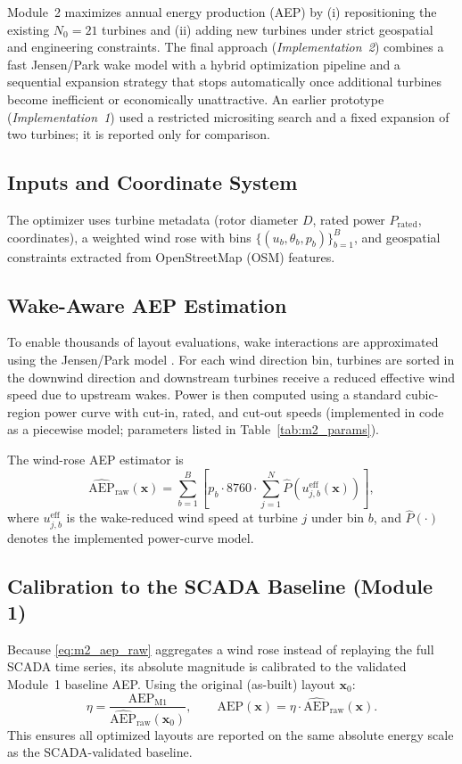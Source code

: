 \documentclass[lettersize,journal]{IEEEtran}
\begin{document}
Module~2 maximizes annual energy production (AEP) by (i) repositioning the existing $N_0=21$ turbines and (ii) adding new turbines under strict geospatial and engineering constraints. The final approach (\textit{Implementation~2}) combines a fast Jensen/Park wake model with a hybrid optimization pipeline and a sequential expansion strategy that stops automatically once additional turbines become inefficient or economically unattractive. An earlier prototype (\textit{Implementation~1}) used a restricted micrositing search and a fixed expansion of two turbines; it is reported only for comparison.

\subsection{Inputs and Coordinate System}
The optimizer uses turbine metadata (rotor diameter $D$, rated power $P_{\text{rated}}$, coordinates), a weighted wind rose with bins $\{(u_b,\theta_b,p_b)\}_{b=1}^{B}$, and geospatial constraints extracted from OpenStreetMap (OSM) features.

\subsection{Wake-Aware AEP Estimation}
To enable thousands of layout evaluations, wake interactions are approximated using the Jensen/Park model \cite{shakoor2016jensenreview,katic1987jensen}. For each wind direction bin, turbines are sorted in the downwind direction and downstream turbines receive a reduced effective wind speed due to upstream wakes. Power is then computed using a standard cubic-region power curve with cut-in, rated, and cut-out speeds (implemented in code as a piecewise model; parameters listed in Table~\ref{tab:m2_params}).

The wind-rose AEP estimator is
\begin{equation}
\widehat{\mathrm{AEP}}_{\text{raw}}(\mathbf{x}) = 
\sum_{b=1}^{B} \left[
p_b \cdot 8760 \cdot \sum_{j=1}^{N} \widehat{P}\!\left(u_{j,b}^{\text{eff}}(\mathbf{x})\right)
\right],
\label{eq:m2_aep_raw}
\end{equation}
where $u_{j,b}^{\text{eff}}$ is the wake-reduced wind speed at turbine $j$ under bin $b$, and $\widehat{P}(\cdot)$ denotes the implemented power-curve model.

\subsection{Calibration to the SCADA Baseline (Module 1)}
Because \eqref{eq:m2_aep_raw} aggregates a wind rose instead of replaying the full SCADA time series, its absolute magnitude is calibrated to the validated Module~1 baseline AEP. Using the original (as-built) layout $\mathbf{x}_0$:
\begin{equation}
\eta = \frac{\mathrm{AEP}_{\text{M1}}}{\widehat{\mathrm{AEP}}_{\text{raw}}(\mathbf{x}_0)},
\qquad
\mathrm{AEP}(\mathbf{x}) = \eta\cdot \widehat{\mathrm{AEP}}_{\text{raw}}(\mathbf{x}).
\label{eq:m2_calibration}
\end{equation}
This ensures all optimized layouts are reported on the same absolute energy scale as the SCADA-validated baseline.
\end{document}
